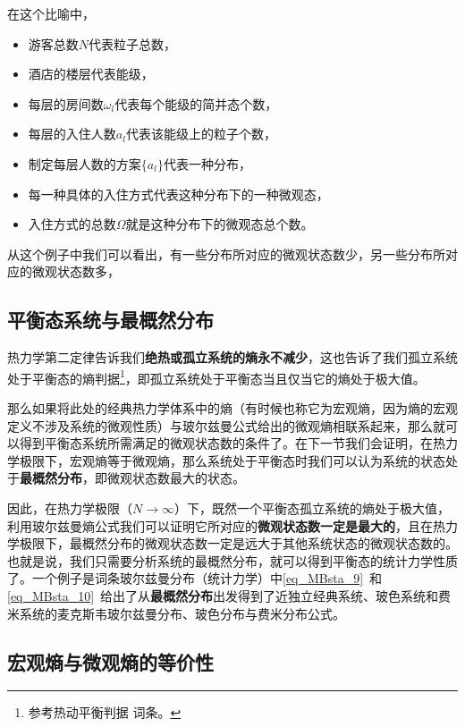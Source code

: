 \begin{example}{}
在这个比喻中，
\begin{itemize}
\item 游客总数$N$代表粒子总数，
\item 酒店的楼层代表能级，
\item 每层的房间数$\omega_l$代表每个能级的简并态个数，
\item 每层的入住人数$a_l$代表该能级上的粒子个数，
\item 制定每层人数的方案$\{a_l\}$代表一种分布，
\item 每一种具体的入住方式代表这种分布下的一种微观态，
\item 入住方式的总数$\Omega$就是这种分布下的微观态总个数。
\end{itemize}
\end{example}
从这个例子中我们可以看出，有一些分布所对应的微观状态数少，另一些分布所对应的微观状态数多，
\subsection{平衡态系统与最概然分布}
热力学第二定律告诉我们\textbf{绝热或孤立系统的熵永不减少}，这也告诉了我们孤立系统处于平衡态的熵判据\footnote{参考热动平衡判据 词条。}，即孤立系统处于平衡态当且仅当它的熵处于极大值。

那么如果将此处的经典热力学体系中的熵（有时候也称它为宏观熵，因为熵的宏观定义不涉及系统的微观性质）与玻尔兹曼公式给出的微观熵相联系起来，那么就可以得到平衡态系统所需满足的微观状态数的条件了。在下一节我们会证明，在热力学极限下，宏观熵等于微观熵，那么系统处于平衡态时我们可以认为系统的状态处于\textbf{最概然分布}，即微观状态数最大的状态。

因此，在热力学极限（$N\rightarrow \infty$）下，既然一个平衡态孤立系统的熵处于极大值，利用玻尔兹曼熵公式我们可以证明它所对应的\textbf{微观状态数一定是最大的}，且在热力学极限下，最概然分布的微观状态数一定是远大于其他系统状态的微观状态数的。也就是说，我们只需要分析系统的最概然分布，就可以得到平衡态的统计力学性质了。一个例子是词条玻尔兹曼分布（统计力学）中\autoref{eq_MBsta_9}~和\autoref{eq_MBsta_10}~给出了从\textbf{最概然分布}出发得到了近独立经典系统、玻色系统和费米系统的麦克斯韦玻尔兹曼分布、玻色分布与费米分布公式。

\subsection{宏观熵与微观熵的等价性}